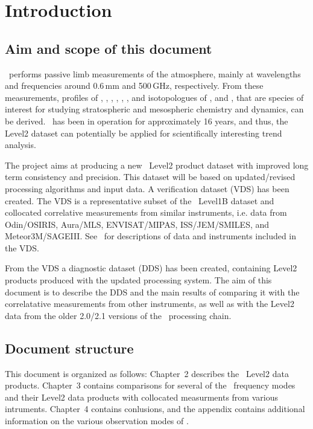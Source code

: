 \chapter{Introduction}
\label{chapter:introduction}


\setcounter{page}{1}


\section{Aim and scope of this document}
\label{sec:aim}
\smr\ performs passive limb measurements of the atmosphere, mainly at
wavelengths and frequencies around 0.6\,mm and 500\,GHz, respectively.  From
these measurements, profiles of , , ,
, , , and isotopologues of ,
and , that are species of interest for studying
stratospheric and mesospheric chemistry and dynamics, can be derived.  \smr\
has been in operation for approximately 16 years, and thus, the Level2 dataset
can potentially be applied for scientifically interesting trend analysis.

The project aims at producing a  new \smr\ Level2 product dataset with improved 
long term consistency and precision.   This dataset will be
based on updated/revised processing algorithms and input data.  A verification
dataset (VDS) has been created. The VDS is a representative subset of the \smr\
Level1B dataset and collocated correlative measurements from similar
instruments, i.e.  data from Odin/OSIRIS, Aura/MLS, ENVISAT/MIPAS,
ISS/JEM/SMILES, and Meteor3M/SAGEIII. See~\cite{VDS:2016} for descriptions of
data and instruments included in the VDS.

From the VDS a diagnostic dataset (DDS) has been created, containing Level2
products produced with the updated processing system. The aim of this document
is to describe the DDS and the main results of comparing it with the
correlatative measurements from other instruments, as well as with the Level2
data from the older 2.0/2.1 versions of the \smr\ processing chain.

\section{Document structure}

This document is organized as follows: Chapter~2 describes the \smr\ Level2
data products. Chapter~3 contains comparisons for several of the \smr\
frequency modes and their Level2 data products with collocated measurments from
various intruments. Chapter~4 contains conlusions, and the appendix contains
additional information on the various observation modes of \smr.
